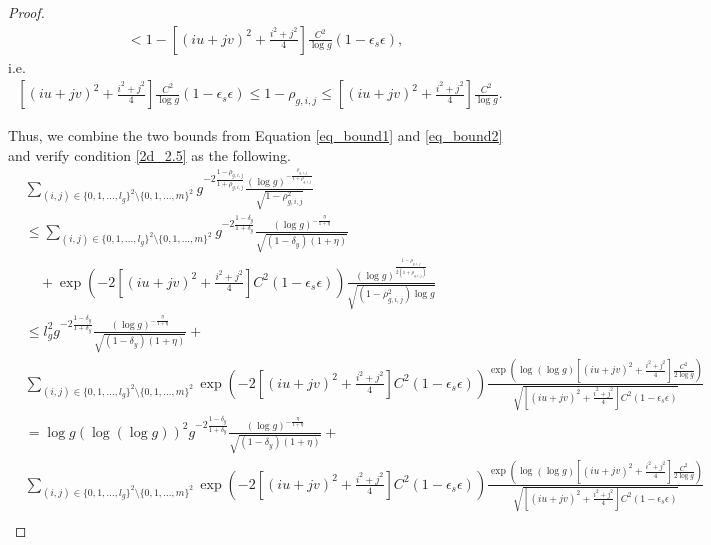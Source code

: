 \documentclass{article}
\begin{document}
\begin{appendices}
\begin{proof}
\begin{equation*}
\begin{aligned}
				&<1-[(iu+jv)^2+\frac{i^2+j^2}{4}]\frac{C^2}{\log g}(1-\epsilon_s\epsilon),
			\end{aligned}
		\end{equation*}
		i.e.
		\begin{equation}
			\label{eq_bound2}
			\begin{aligned}
				[(iu+jv)^2+\frac{i^2+j^2}{4}]\frac{C^2}{\log g}(1-\epsilon_s\epsilon)\leq1-\rho_{g,i,j}\leq[(iu+jv)^2+\frac{i^2+j^2}{4}]\frac{C^2}{\log g}.
			\end{aligned}
		\end{equation}
		
		
		Thus, we combine the two bounds from Equation \ref{eq_bound1} and \ref{eq_bound2} and verify condition \ref{2d_2.5} as the following.
		\begin{equation*}
			\begin{aligned}
				&\sum_{(i,j) \in \{0,1,...,l_g\}^2 \setminus \{0,1,...,m\}^2} g^{-2\frac{1-\rho_{g,i,j}}{1+\rho_{g,i,j}}} \frac{\left( \log g \right)^{-\frac{\rho_{g,i,j}}{1+\rho_{g,i,j}}}}{\sqrt{1-\rho^2_{g,i,j}}} \\
				&\leq\sum_{(i,j) \in \{0,1,...,l_g\}^2 \setminus \{0,1,...,m\}^2} g^{-2\frac{1-\delta_y}{1+\delta_y}}\frac{\left( \log g \right)^{-\frac{\eta}{1+\eta}}}{\sqrt{(1-\delta_y)(1+\eta)}}\\
				&\quad+\exp\left(-2[(iu+jv)^2+\frac{i^2+j^2}{4}]C^2(1-\epsilon_s\epsilon) \right) \frac{\left( \log g \right)^{\frac{1-\rho_{g,i,j}}{2(1+\rho_{g,i,j})}}}{\sqrt{(1-\rho^2_{g,i,j})\log g}}   \\
				&\leq l_g^2 g^{-2\frac{1-\delta_y}{1+\delta_y}}\frac{\left( \log g \right)^{-\frac{\eta}{1+\eta}}}{\sqrt{(1-\delta_y)(1+\eta)}}+\\
				&\sum_{(i,j) \in \{0,1,...,l_g\}^2 \setminus \{0,1,...,m\}^2} \exp\left(-2[(iu+jv)^2+\frac{i^2+j^2}{4}]C^2(1-\epsilon_s\epsilon) \right) \frac{\exp\left( \log(\log g) {[(iu+jv)^2+\frac{i^2+j^2}{4}]\frac{C^2}{2\log g}}\right)}{\sqrt{[(iu+jv)^2+\frac{i^2+j^2}{4}]C^2(1-\epsilon_s\epsilon)}}\\
				&=\log g (\log(\log g))^2g^{-2\frac{1-\delta_y}{1+\delta_y}}\frac{\left( \log g \right)^{-\frac{\eta}{1+\eta}}}{\sqrt{(1-\delta_y)(1+\eta)}}+\\
				&\sum_{(i,j) \in \{0,1,...,l_g\}^2 \setminus \{0,1,...,m\}^2} \exp\left(-2[(iu+jv)^2+\frac{i^2+j^2}{4}]C^2(1-\epsilon_s\epsilon) \right) \frac{\exp\left( \log(\log g) {[(iu+jv)^2+\frac{i^2+j^2}{4}]\frac{C^2}{2\log g}}\right)}{\sqrt{[(iu+jv)^2+\frac{i^2+j^2}{4}]C^2(1-\epsilon_s\epsilon)}}\\

\end{aligned}
\end{equation*}
\end{proof}
\end{appendices}
\end{document}
